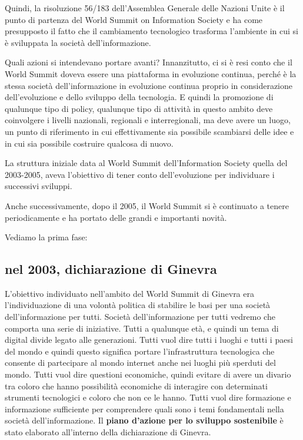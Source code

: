 Quindi, la risoluzione 56/183 dell'Assemblea Generale delle Nazioni Unite è il punto di partenza del World Summit on Information Society e ha come presupposto il fatto che il cambiamento tecnologico trasforma l'ambiente in cui si è sviluppata la società dell'informazione.\par  
Quali azioni si intendevano portare avanti? Innanzitutto, ci si è resi conto che il World Summit doveva essere una piattaforma in evoluzione continua, perché è la stessa società dell'informazione in evoluzione continua proprio in considerazione dell'evoluzione e dello sviluppo della tecnologia. E quindi la promozione di qualunque tipo di policy, qualunque tipo di attività in questo ambito deve coinvolgere i livelli nazionali, regionali e interregionali, ma deve avere un luogo, un punto di riferimento in cui effettivamente sia possibile scambiarsi delle idee e in cui sia possibile costruire qualcosa di nuovo. \par
La struttura iniziale data al World Summit dell'Information Society quella del 2003-2005, aveva l'obiettivo di tener conto dell'evoluzione per individuare i successivi sviluppi.\par
Anche successivamente, dopo il 2005, il World Summit si è continuato a tenere periodicamente e ha portato delle grandi e importanti novità. \par

Vediamo la prima fase: 
\subsection{nel 2003, dichiarazione di Ginevra} 
L'obiettivo individuato nell'ambito del World Summit di Ginevra era l'individuazione di una volontà politica di stabilire le basi per una società dell'informazione per tutti. Società dell'informazione per tutti vedremo che comporta una serie di iniziative. Tutti a qualunque età, e quindi un tema di digital divide legato alle generazioni. Tutti vuol dire tutti i luoghi e tutti i paesi del mondo e quindi questo significa portare l'infrastruttura tecnologica che consente di partecipare al mondo internet anche nei luoghi più sperduti del mondo. Tutti vuol dire questioni economiche, quindi evitare di avere un divario tra coloro che hanno possibilità economiche di interagire con determinati strumenti tecnologici e coloro che non ce le hanno. Tutti vuol dire formazione e informazione sufficiente per comprendere quali sono i temi fondamentali nella società dell'informazione. 
Il \textbf{piano d'azione per lo sviluppo sostenibile} è stato elaborato all'interno della dichiarazione di Ginevra. \par

